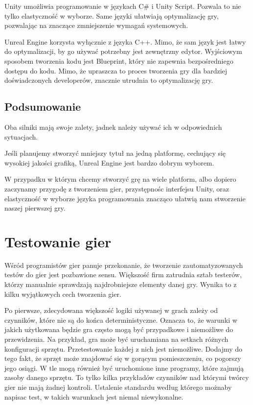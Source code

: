 \documentclass[brudnopis]{xmgr}
\begin{document}
Unity umożliwia programowanie w językach C\# i Unity Script. Pozwala to nie tylko elastyczność w wyborze. Same języki ułatwiają optymalizację gry, pozwalając na znaczące zmniejszenie wymagań systemowych.

Unreal Engine korzysta wyłącznie z języka C++. Mimo, że sam język jest łatwy do optymalizacji, by go używać potrzebny jest zewnętrzny edytor. Wyjściowym sposobem tworzenia kodu jest Blueprint, który nie zapewnia bezpośredniego dostępu do kodu. Mimo, że upraszcza to proces tworzenia gry dla bardziej doświadczonych developerów, znacznie utrudnia to optymalizację gry.

\section{Podsumowanie}

Oba silniki mają swoje zalety, jadnek należy używać ich w odpowiednich sytuacjach.

Jeśli planujemy stworzyć mniejszy tytuł na jedną platformę, cechujący się wysokiej jakości grafiką, Unreal Engine jest bardzo dobrym wyborem.

W przypadku w którym chcemy stworzyć grę na wiele platform, albo dopiero zaczynamy przygodę z tworzeniem gier, przystępnośc interfejsu Unity, oraz elastyczność w wyborze języka programowania znacząco ułatwią nam stworzenie naszej pierwszej gry.

\chapter{ Testowanie gier}

Wśród programistów gier panuje przekonanie, że tworzenie zautomatyzowanych testów do gier jest pozbawione sensu. Większość firm zatrudnia sztab testerów, którzy manualnie sprawdzają najdrobniejsze elementy danej gry. Wynika to z kilku wyjątkowych cech tworzenia gier.

Po pierwsze, zdecydowana większość logiki używanej w grach zależy od czynników, które nie są do końca deterministyczne. Oznacza to, że warunki w jakich użytkowana będzie gra często mogą być przypadkowe i niemożliwe do przewidzenia. Na przykład, gra może być uruchamiana na setkach różnych konfiguracji sprzętu. Przetestowanie każdej z nich jest niemożliwe. Dodajmy do tego fakt, że sprzęt może znajdować się w gorącym pomieszczeniu, co pogorszy jego osiągi. W tle mogą również być uruchomione inne programy, które zajmują zasoby danego sprzętu. To tylko kilka przykładów czynników nad którymi twórcy gier nie mają żadnej kontroli. Ustalenie standardu według którego możnaby napisac test, w takich warunkach jest niemal niewykonalne.
\end{document}
